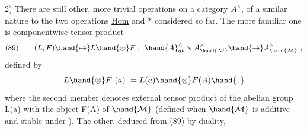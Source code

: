 2) There are still other, more trivial operations on a category $A^{\wedge}$,
of a  similar nature to the two operations \uline{Hom} and $*$ considered so
far. The more familiar one is componentwise tensor product
\[
(89)\qquad (L,F)\hand{\mapsto} L\hand{\otimes}F : \ \hand{A}^{\wedge}_{ab}\times A^{\wedge}_{\hand{\mathcal{M}}}\hand{\to} A^{\wedge}_{\hand{\mathcal{M}}} \ ,
\]
defined by
\[
L\hand{\otimes}F\ (a) \ = L(a)\hand{\otimes}F(A)\hand{,}
\]
where the second member denotes external tensor product of the abelian
group L(a) with the object F(A) of $\hand{\mathcal{M}}$ (defined when $\hand{\mathcal{M}}$ is additive and
stable under ). The other, deduced from (89) by duality,

